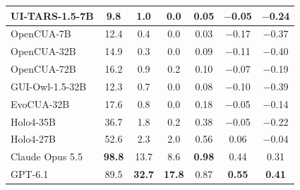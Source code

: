 \begin{table}[t]
{\begin{tabular}{@{}l ccc @{\hspace{6pt}} ccc@{}}
    UI-TARS-1.5-7B         & 9.8 & 1.0 & 0.0 & 0.05 & $-$0.05 & $-$0.24 \\
    \midrule
    OpenCUA-7B             & 12.4 & 0.4 & 0.0 & 0.03 & $-$0.17 & $-$0.37 \\
    OpenCUA-32B            & 14.9 & 0.3 & 0.0 & 0.09 & $-$0.11 & $-$0.40 \\
    OpenCUA-72B            & 16.2 & 0.9 & 0.2 & 0.10 & $-$0.07 & $-$0.19 \\
    \midrule
    GUI-Owl-1.5-32B        & 12.3 & 0.7 & 0.0 & 0.08 & $-$0.10 & $-$0.39 \\
    \midrule
    EvoCUA-32B             & 17.6 & 0.8 & 0.0 & 0.18 & $-$0.05 & $-$0.14 \\
    \midrule
    Holo4-35B              & 36.7 & 1.8 & 0.2 & 0.38 & $-$0.05 & $-$0.22 \\
    Holo4-27B              & 52.6 & 2.3 & 2.0 & 0.56 & 0.06 & $-$0.04 \\
    \midrule
    Claude Opus 5.5        & \textbf{98.8} & 13.7 & 8.6 & \textbf{0.98} & 0.44 & 0.31 \\
    \midrule
    GPT-6.1                & 89.5 & \textbf{32.7} & \textbf{17.8} & 0.87 & \textbf{0.55} & \textbf{0.41} \\
    \bottomrule
  \end{tabular}}
\end{table}
